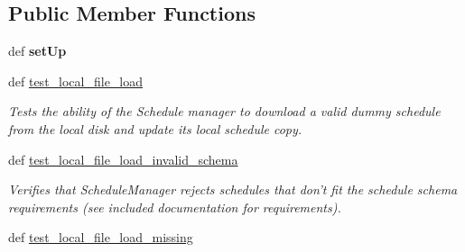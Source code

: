 \subsection*{Public Member Functions}
\begin{DoxyCompactItemize}
\item 
\hypertarget{classhwm_1_1sessions_1_1tests_1_1test__schedule_1_1_test_schedule_a53c04d1ce7982c94c18e193f5fae6de3}{def {\bfseries set\-Up}}\label{classhwm_1_1sessions_1_1tests_1_1test__schedule_1_1_test_schedule_a53c04d1ce7982c94c18e193f5fae6de3}

\item 
\hypertarget{classhwm_1_1sessions_1_1tests_1_1test__schedule_1_1_test_schedule_a81669427da2aaa2ff48f0d21c8925ee2}{def \hyperlink{classhwm_1_1sessions_1_1tests_1_1test__schedule_1_1_test_schedule_a81669427da2aaa2ff48f0d21c8925ee2}{test\-\_\-local\-\_\-file\-\_\-load}}\label{classhwm_1_1sessions_1_1tests_1_1test__schedule_1_1_test_schedule_a81669427da2aaa2ff48f0d21c8925ee2}

\begin{DoxyCompactList}\small\item\em Tests the ability of the Schedule manager to download a valid dummy schedule from the local disk and update its local schedule copy. \end{DoxyCompactList}\item 
\hypertarget{classhwm_1_1sessions_1_1tests_1_1test__schedule_1_1_test_schedule_ae11c8a73b939a92ff398b948b0afa015}{def \hyperlink{classhwm_1_1sessions_1_1tests_1_1test__schedule_1_1_test_schedule_ae11c8a73b939a92ff398b948b0afa015}{test\-\_\-local\-\_\-file\-\_\-load\-\_\-invalid\-\_\-schema}}\label{classhwm_1_1sessions_1_1tests_1_1test__schedule_1_1_test_schedule_ae11c8a73b939a92ff398b948b0afa015}

\begin{DoxyCompactList}\small\item\em Verifies that Schedule\-Manager rejects schedules that don't fit the schedule schema requirements (see included documentation for requirements). \end{DoxyCompactList}\item 
\hypertarget{classhwm_1_1sessions_1_1tests_1_1test__schedule_1_1_test_schedule_ae9a9f2dd3dbd2169a24bfc6210f5b238}{def \hyperlink{classhwm_1_1sessions_1_1tests_1_1test__schedule_1_1_test_schedule_ae9a9f2dd3dbd2169a24bfc6210f5b238}{test\-\_\-local\-\_\-file\-\_\-load\-\_\-missing}}\label{classhwm_1_1sessions_1_1tests_1_1test__schedule_1_1_test_schedule_ae9a9f2dd3dbd2169a24bfc6210f5b238}


\end{DoxyCompactItemize}
